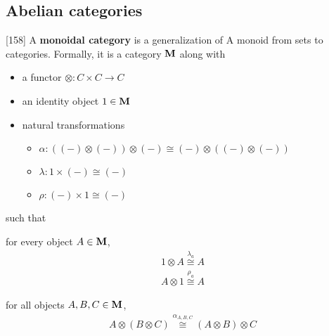 \subsection{Abelian categories}\label{sec:abelian_categories}

\begin{definition}\label{def:monoidal_category}\cite{MacLane1994}[158]
  A \textbf{monoidal category} is a generalization of A monoid from sets to categories. Formally, it is a category \( \operatorname{\mathbf{M}} \) along with
  \begin{itemize}
    \item a functor \( \otimes: C \times C \to C \)
    \item an identity object \( 1 \in \operatorname{\mathbf{M}} \)
    \item natural transformations
    \begin{itemize}
      \item[] \( \alpha: ((-) \otimes (-)) \otimes (-) \cong (-) \otimes ((-) \otimes (-)) \)
      \item[] \( \lambda: 1 \times (-) \cong (-) \)
      \item[] \( \rho: (-) \times 1 \cong (-) \)
    \end{itemize}
  \end{itemize}
  such that
  \begin{defenum}
    \item for every object \( A \in \operatorname{\mathbf{M}} \),
    \begin{align*}
      1 \otimes A \overset {\lambda_a} \cong A
      \\
      A \otimes 1 \overset {\rho_a} \cong A
    \end{align*}

    \item for all objects \( A, B, C \in \operatorname{\mathbf{M}} \),
    \begin{align*}
      A \otimes (B \otimes C) \overset {\alpha_{A,B,C}} \cong (A \otimes B) \otimes C
    \end{align*}


\end{defenum}
\end{definition}
